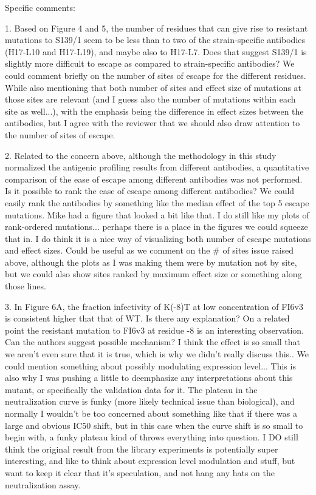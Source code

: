 \documentclass[11pt, oneside]{article}   	%
\begin{document}
Specific comments:

1. Based on Figure 4 and 5, the number of residues that can give rise to resistant mutations to S139/1 seem to be less than to two of the strain-specific antibodies (H17-L10 and H17-L19), and maybe also to H17-L7. Does that suggest S139/1 is slightly more difficult to escape as compared to strain-specific antibodies?
{\color{red} We could comment briefly on the number of sites of escape for the different residues.}
{\color{blue} While also mentioning that both number of sites and effect size of mutations at those sites are relevant (and I guess also the number of mutations within each site as well...), with the emphasis being the difference in effect sizes between the antibodies, but I agree with the reviewer that we should also draw attention to the number of sites of escape.}

2. Related to the concern above, although the methodology in this study normalized the antigenic profiling results from different antibodies, a quantitative comparison of the ease of escape among different antibodies was not performed. Is it possible to rank the ease of escape among different antibodies?
{\color{red} We could easily rank the antibodies by something like the median effect of the top 5 escape mutations. Mike had a figure that looked a bit like that.}
{\color{blue} I do still like my plots of rank-ordered mutations... perhaps there is a place in the figures we could squeeze that in. I do think it is a nice way of visualizing both number of escape mutations and effect sizes. Could be useful as we comment on the # of sites issue raised above, although the plots as I was making them were by mutation not by site, but we could also show sites ranked by maximum effect size or something along those lines.}

3. In Figure 6A, the fraction infectivity of K(-8)T at low concentration of FI6v3 is consistent higher that that of WT. Is there any explanation? On a related point the resistant mutation to FI6v3 at residue -8 is an interesting observation. Can the authors suggest possible mechanism?
{\color{red} I think the effect is so small that we aren't even sure that it is true, which is why we didn't really discuss this.. We could mention something about possibly modulating expression level...}
{\color{blue} This is also why I was pushing a little to deemphasize any interpretations about this mutant, or specifically the validation data for it. The plateau in the neutralization curve is funky (more likely technical issue than biological), and normally I wouldn't be too concerned about something like that if there was a large and obvious IC50 shift, but in this case when the curve shift is so small to begin with, a funky plateau kind of throws everything into question. I DO still think the original result from the library experiments is potentially super interesting, and like to think about expression level modulation and stuff, but want to keep it clear that it's speculation, and not hang any hats on the neutralization assay.}
\end{document}
